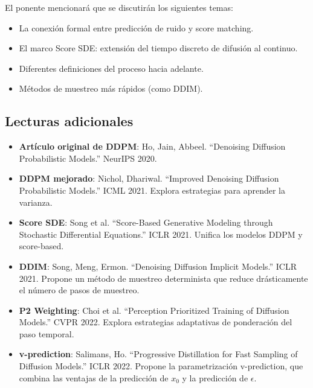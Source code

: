 El ponente mencionará que se discutirán los siguientes temas:
\begin{itemize}
    \item La conexión formal entre predicción de ruido y score matching.
    \item El marco Score SDE: extensión del tiempo discreto de difusión al continuo.
    \item Diferentes definiciones del proceso hacia adelante.
    \item Métodos de muestreo más rápidos (como DDIM).
\end{itemize}

\subsection{Lecturas adicionales}

\begin{itemize}
    \item \textbf{Artículo original de DDPM}: Ho, Jain, Abbeel. ``Denoising Diffusion Probabilistic Models.'' NeurIPS 2020.
    \item \textbf{DDPM mejorado}: Nichol, Dhariwal. ``Improved Denoising Diffusion Probabilistic Models.'' ICML 2021. Explora estrategias para aprender la varianza.
    \item \textbf{Score SDE}: Song et al. ``Score-Based Generative Modeling through Stochastic Differential Equations.'' ICLR 2021. Unifica los modelos DDPM y score-based.
    \item \textbf{DDIM}: Song, Meng, Ermon. ``Denoising Diffusion Implicit Models.'' ICLR 2021. Propone un método de muestreo determinista que reduce drásticamente el número de pasos de muestreo.
    \item \textbf{P2 Weighting}: Choi et al. ``Perception Prioritized Training of Diffusion Models.'' CVPR 2022. Explora estrategias adaptativas de ponderación del paso temporal.
    \item \textbf{v-prediction}: Salimans, Ho. ``Progressive Distillation for Fast Sampling of Diffusion Models.'' ICLR 2022. Propone la parametrización v-prediction, que combina las ventajas de la predicción de $x_0$ y la predicción de $\epsilon$.
\end{itemize}


